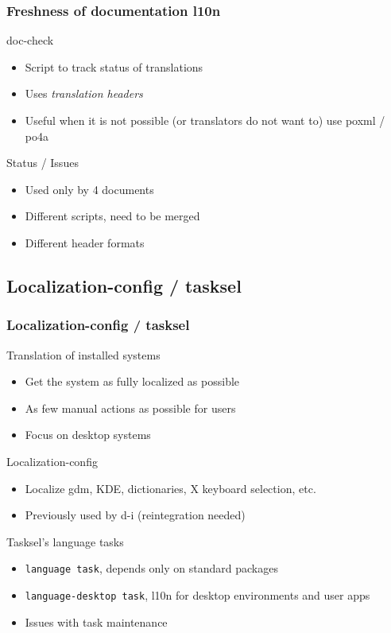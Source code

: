 \documentclass{beamer}
\begin{document}
\begin{frame}
  \frametitle{Freshness of documentation l10n}
	\begin{block}
		{doc-check}
		\begin{itemize}
		\item Script to track status of translations
		\item Uses {\em translation headers}
		\item Useful when it is not possible (or translators do not want to) use poxml / po4a
		\end{itemize}
	\end{block}
	\begin{block}
		{Status / Issues}
		\begin{itemize}
		\item Used only by 4 documents
		\item Different scripts, need to be merged
		\item Different header formats
		\end{itemize}
	\end{block}
\end{frame}

\subsection{Localization-config / tasksel}

\begin{frame}
  \frametitle{Localization-config / tasksel}
	\begin{block}
		{Translation of installed systems}
		\begin{itemize}
		\item Get the system as fully localized as possible
		\item As few manual actions as possible for users 
		\item Focus on desktop systems
		\end{itemize}
	\end{block}
	\begin{block}
		{Localization-config}
		\begin{itemize}
		\item Localize gdm, KDE, dictionaries, X keyboard selection, etc.
		\item Previously used by d-i (reintegration needed)
		\end{itemize}
	\end{block}
	\begin{block}
		{Tasksel's language tasks}
		\begin{itemize}
		\item
			{\texttt{language task}}, depends only on standard packages
		\item
			{\texttt{language-desktop task}}, l10n for desktop environments and user apps
		\item
			{Issues with task maintenance}
		\end{itemize}
	\end{block}
\end{frame}
\end{document}
